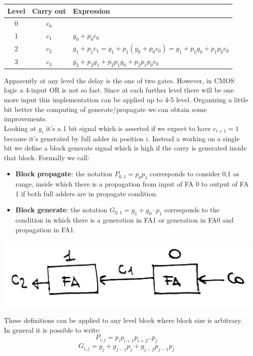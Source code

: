 \begin{center}
  \begin{tabular}{|c|c|l|}
    \hline
    Level& Carry out& Expression\\
    \hline
     0&   $c_0$&  \\
    1&    $c_1$& $g_0+p_0c_0$\\
    2&    $c_2$& $g_1+p_1c_1=g_1+p_1(g_0+p_0c_0)=g_1+p_1g_0+p_1p_0c_0$\\
    3&    $c_3$& $g_2+p_2g_1+p_2p_1g_0+p_2p_1p_0c_0$\\
    \hline
  \end{tabular}
\end{center}

Apparently at any level the delay is the one of two gates. However, in CMOS 
logic a 4-input OR is not so fast. Since at each further level there will be one
more input this implementation can be applied up to 4-5 level. Organizing a 
little bit better the computing of generate/propagate 
we can obtain some improvements.\\

Looking at $g_i$ it's a 1 bit signal which is asserted if we expect to have $c_{i+1}=1$ because it's generated by full adder in position $i$. Instead a working on a single bit we define a block generate signal which is high if the carry is generated inside that block. Formally we call:

\begin{itemize}
  \item \textbf{Block propagate}: the notation $P_{0,1}=p_0p_1$ corresponds to consider {0,1} as range, inside which there is a propagation from input of FA 0 to output of FA 1 if both full adders are in propagate condition.
  \item \textbf{Block generate}: the notation $G_{0,1}=g_1+g_0 \cdot p_1$ corresponds to the condition in which there is a generation in FA1 or generation in FA0 and propagation in FA1.
\end{itemize}

\begin{center}
  \includegraphics[width=0.6\linewidth]{img/img2/11}
\end{center}


These definitions can be applied to any level block where block size is arbitrary. In general it is possible to write:
$$P_{i,j}=p_ip_{i+1}p_{i+2}..p_{j}$$
$$G_{i,j}=g_j+g_{j-1}p_j+g_{j-2}p_{j-1}p_j$$

